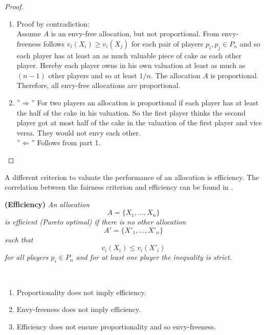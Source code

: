 \begin{proof}
\textcolor{white}{x}
\begin{enumerate}
\item Proof by contradiction:\\ Assume $A$ is an envy-free allocation, but not proportional. From envy-freeness follows $v_i(X_i) \geq v_i(X_j)$ for each pair of players $p_i, p_j \in P_n$ and so each player has at least an as much valuable piece of cake as each other player. Hereby each player owns in his own valuation at least as much as $(n-1)$ other players and so at least $1/n$. \blitza The allocation $A$ is proportional. %
\\Therefore, all envy-free allocations are proportional.
\item ''$\Rightarrow$'' For two players an allocation is proportional if each player has at least the half of the cake in his valuation. So the first player thinks the second player got at most half of the cake in the valuation of the first player and vice versa. They would not envy each other.\\ ''$\Leftarrow$'' Follows from part 1.\\
\end{enumerate}
\end{proof}
A different criterion to valuate the performance of an allocation is efficiency. The correlation between the fairness criterion and efficiency can be found in \cite{eff}. 
\begin{defi}{\textbf{(Efficiency)}}
\newline \emph{An allocation \[A=\{X_1,\dots, X_n\}\] is \emph{efficient (Pareto optimal)} if there is no other allocation \[A'=\{X'_1,\dots, X'_n\}\] such that \[v_i(X_i)\leq v_i(X'_i)\] for all players $p_i \in P_n$ and for at least one player the inequality is strict.}
\end{defi}
%
\begin{lem}
\textcolor{white}{x}
	\begin{enumerate}
		\item Proportionality does not imply efficiency.
		\item Envy-freeness does not imply efficiency.
		\item Efficiency does not ensure proportionality and so envy-freeness.
	\end{enumerate}
\end{lem}

